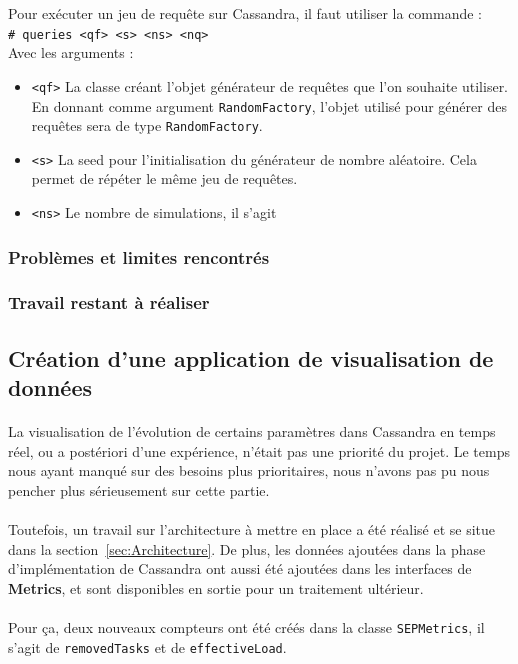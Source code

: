 \documentclass[12pt]{article}
\newcommand{\class}[1]{\texttt{#1}}
\newcommand{\shellcmd}[1]{\\\indent\indent\texttt{\footnotesize\# #1}\\}
\begin{document}
Pour exécuter un jeu de requête sur Cassandra, il faut utiliser la commande :
\shellcmd{queries <qf> <s> <ns> <nq>}
Avec les arguments :
\begin{itemize}
 \item \texttt{<qf>} La classe créant l'objet générateur de requêtes que l'on souhaite utiliser. En donnant comme argument \class{RandomFactory}, l'objet utilisé pour générer des requêtes sera de type \class{RandomFactory}.
 \item \texttt{<s>} La seed pour l'initialisation du générateur de nombre aléatoire. Cela permet de répéter le même jeu de requêtes.
 \item \texttt{<ns>} Le nombre de simulations, il s'agit
\end{itemize}


\subsubsection*{Problèmes et limites rencontrés}
\subsubsection*{Travail restant à réaliser}

\subsection{Création d'une application de visualisation de données}

\paragraph{}La visualisation de l'évolution de certains paramètres dans Cassandra en temps réel, ou a postériori d'une expérience, n'était pas une priorité du projet. Le temps nous ayant manqué sur des besoins plus prioritaires, nous n'avons pas pu nous pencher plus sérieusement sur cette partie.

\paragraph{}Toutefois, un travail sur l'architecture à mettre en place a été réalisé et se situe dans la section~\ref{sec:Architecture}. De plus, les données ajoutées dans la phase d'implémentation de Cassandra ont aussi été ajoutées dans les interfaces de \textbf{Metrics}, et sont disponibles en sortie pour un traitement ultérieur.


\paragraph{}Pour ça, deux nouveaux compteurs ont été créés dans la classe \class{SEPMetrics}, il s'agit de \texttt{removedTasks} et de \texttt{effectiveLoad}.
\end{document}
